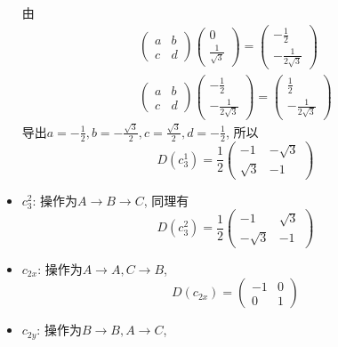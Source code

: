 \documentclass[UTF8]{ctexart}
\begin{document}
\begin{itemize}
由
\begin{gather}
  \begin{pmatrix}
    a & b \\
    c & d
  \end{pmatrix}
  \begin{pmatrix}
    0 \\
    \frac{1}{\sqrt{3}}
  \end{pmatrix} =
  \begin{pmatrix}
    -\frac{1}{2} \\
    -\frac{1}{2\sqrt{3}}
  \end{pmatrix} \\
  \begin{pmatrix}
    a & b\\
    c & d
  \end{pmatrix}
  \begin{pmatrix}
    -\frac{1}{2} \\
    -\frac{1}{2\sqrt{3}}
  \end{pmatrix} =
  \begin{pmatrix}
    \frac{1}{2}\\
    -\frac{1}{2\sqrt{3}}
  \end{pmatrix}
\end{gather}
导出$a = -\frac{1}{2}, b = -\frac{\sqrt{3}}{2}, c = \frac{\sqrt{3}}{2}, d = -\frac{1}{2}$, 所以
\begin{equation}
  D(c_3^1) = \frac{1}{2}
  \begin{pmatrix}
    -1 & -\sqrt{3} \\
    \sqrt{3} & -1
  \end{pmatrix}
\end{equation}
\item $c_3^2$: 操作为$A\rightarrow B\rightarrow C$, 同理有
  \begin{equation}
    D(c_3^2) = \frac{1}{2}
    \begin{pmatrix}
      -1 & \sqrt{3} \\
      -\sqrt{3} & -1
    \end{pmatrix}
  \end{equation}
\item $c_{2x}$: 操作为$A \rightarrow A, C \rightarrow B$,
  \begin{equation}
    D(c_{2x}) =
    \begin{pmatrix}
      -1 & 0 \\
      0 & 1
    \end{pmatrix}
  \end{equation}
\item $c_{2y}$: 操作为$B \rightarrow B, A \rightarrow C$,

\end{itemize}
\end{document}
